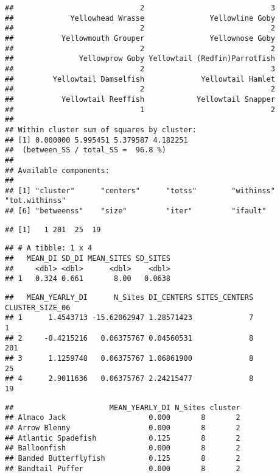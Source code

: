 \documentclass[
]{article}
\begin{document}
\begin{verbatim}
##                             2                             3 
##             Yellowhead Wrasse               Yellowline Goby 
##                             2                             2 
##           Yellowmouth Grouper               Yellownose Goby 
##                             2                             2 
##               Yellowprow Goby Yellowtail (Redfin)Parrotfish 
##                             2                             3 
##         Yellowtail Damselfish             Yellowtail Hamlet 
##                             2                             2 
##           Yellowtail Reeffish            Yellowtail Snapper 
##                             1                             2 
## 
## Within cluster sum of squares by cluster:
## [1] 0.000000 5.995451 5.379587 4.182251
##  (between_SS / total_SS =  96.8 %)
## 
## Available components:
## 
## [1] "cluster"      "centers"      "totss"        "withinss"     "tot.withinss"
## [6] "betweenss"    "size"         "iter"         "ifault"
\end{verbatim}

\begin{verbatim}
## [1]   1 201  25  19
\end{verbatim}

\begin{verbatim}
## # A tibble: 1 x 4
##   MEAN_DI SD_DI MEAN_SITES SD_SITES
##     <dbl> <dbl>      <dbl>    <dbl>
## 1   0.324 0.661       8.00   0.0638
\end{verbatim}

\begin{verbatim}
##   MEAN_YEARLY_DI      N_Sites DI_CENTERS SITES_CENTERS CLUSTER_SIZE_06
## 1      1.4543713 -15.62062947 1.28571423             7               1
## 2     -0.4215216   0.06375767 0.04560531             8             201
## 3      1.1259748   0.06375767 1.06861900             8              25
## 4      2.9011636   0.06375767 2.24215477             8              19
\end{verbatim}

\begin{verbatim}
##                      MEAN_YEARLY_DI N_Sites cluster
## Almaco Jack                   0.000       8       2
## Arrow Blenny                  0.000       8       2
## Atlantic Spadefish            0.125       8       2
## Balloonfish                   0.000       8       2
## Banded Butterflyfish          0.125       8       2
## Bandtail Puffer               0.000       8       2
\end{verbatim}
\end{document}

